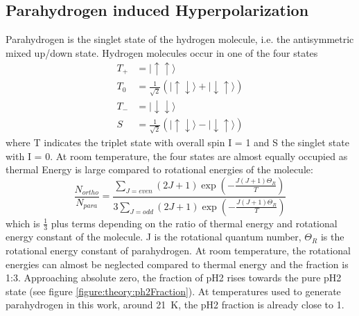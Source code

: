         \subsection{Parahydrogen induced Hyperpolarization}
            Parahydrogen is the singlet state of the hydrogen molecule, i.e. the antisymmetric mixed up/down state. Hydrogen molecules occur in one of the four states
            \begin{equation}
                 \begin{aligned}
                    T_+ &= |\uparrow\uparrow\rangle\\
                    T_0 &= \frac{1}{\sqrt{2}}\left(|\uparrow\downarrow\rangle + |\downarrow\uparrow\rangle\right)\\
                    T_- &= |\downarrow\downarrow\rangle\\
                    S &= \frac{1}{\sqrt{2}}\left(|\uparrow\downarrow\rangle - |\downarrow\uparrow\rangle\right)
                 \end{aligned}
            \end{equation}
            where T indicates the triplet state with overall spin I = 1 and S the singlet state with I = 0. At room temperature, the four states are almost equally occupied as thermal Energy is large compared to rotational energies of the molecule\cite{theTheoryAndPracticeOfHyperpolarizationInMrUsingh2}:
            \begin{equation}
                \frac{N_{ortho}}{N_{para}} = \frac{\sum_{J=even}(2J+1)\exp\left(-\frac{J(J+1)\Theta_R}{T}\right)}{3\sum_{J=odd}\left(2J+1\right)\exp\left(-\frac{J(J+1)\Theta_R}{T}\right)}
            \end{equation}
            which is $\tfrac{1}{3}$ plus terms depending on the ratio of thermal energy and rotational energy constant of the molecule. J is the rotational quantum number, $\Theta_R$ is the rotational energy constant of parahydrogen\cite{ortohydrogen,parahydrogenAndHeavyHydrogen}. At room temperature, the rotational energies can almost be neglected compared to thermal energy and the fraction is 1:3. Approaching absolute zero, the fraction of pH2 rises towards the pure pH2 state (see figure \ref{figure:theory:ph2Fraction}). At temperatures used to generate parahydrogen in this work, around \SI{21}{\kelvin}, the pH2 fraction is already close to 1.
